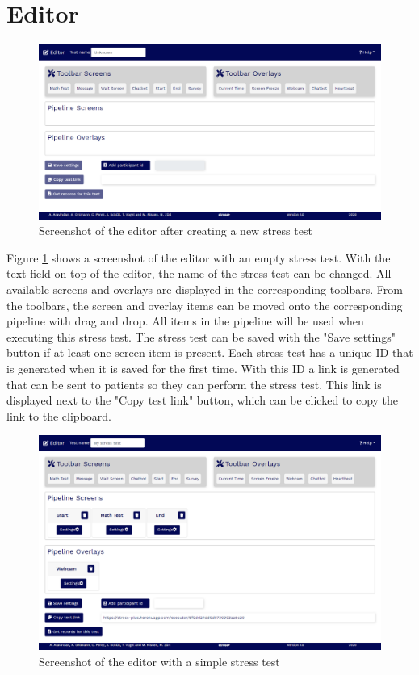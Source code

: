 \section{Editor}
\label{sec:editor}

\begin{figure}[htb]
    \centering
    \includegraphics[width=\textwidth]{figures/screenshot-editor.png}
    \caption{Screenshot of the editor after creating a new stress test}
    \label{fig:screenshot-editor}
\end{figure}

Figure \ref{fig:screenshot-editor} shows a screenshot of the editor with an empty stress test.
With the text field on top of the editor, the name of the stress test can be changed.
All available screens and overlays are displayed in the corresponding toolbars.
From the toolbars, the screen and overlay items can be moved onto the corresponding pipeline with drag and drop.
All items in the pipeline will be used when executing this stress test.
The stress test can be saved with the "Save settings" button if at least one screen item is present.
Each stress test has a unique ID that is generated when it is saved for the first time.
With this ID a link is generated that can be sent to patients so they can perform the stress test.
This link is displayed next to the "Copy test link" button, which can be clicked to copy the link to the clipboard.

\begin{figure}[htb]
    \centering
    \includegraphics[width=\textwidth]{figures/screenshot-editor-with-items.png}
    \caption{Screenshot of the editor with a simple stress test}
    \label{fig:screenshot-editor-with-items}
\end{figure}

